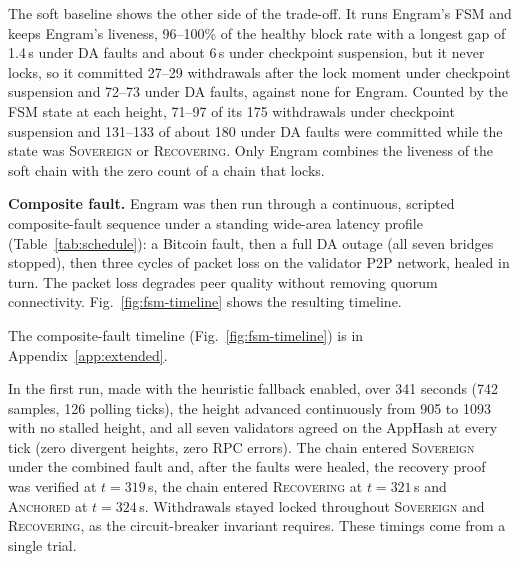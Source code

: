 The soft baseline shows the other side of the trade-off. It runs Engram's FSM
and keeps Engram's liveness, 96--100\% of the healthy block rate with a longest
gap of 1.4\,s under DA faults and about 6\,s under checkpoint suspension, but it never locks, so it committed 27--29 withdrawals after
the lock moment under checkpoint suspension and 72--73 under DA faults, against
none for Engram. Counted by the FSM state at each height, 71--97 of its 175
withdrawals under checkpoint suspension and 131--133 of about 180 under DA faults
were committed while the state was \textsc{Sovereign} or \textsc{Recovering}.
Only Engram combines the liveness of the soft chain with the zero count of a
chain that locks.

\textbf{Composite fault.} Engram was then run through a continuous, scripted
composite-fault sequence under a standing wide-area latency profile
(Table~\ref{tab:schedule}): a Bitcoin fault, then a full DA outage (all seven
bridges stopped), then three cycles of packet loss on the validator P2P
network, healed in turn. The
packet loss degrades peer quality without removing quorum connectivity.
Fig.~\ref{fig:fsm-timeline} shows the resulting timeline.

The composite-fault timeline (Fig.~\ref{fig:fsm-timeline}) is in Appendix~\ref{app:extended}.

In the first run, made with the heuristic fallback enabled, over 341 seconds (742 samples, 126 polling ticks), the height
advanced continuously from 905 to 1093 with no stalled height, and all seven
validators agreed on the AppHash at every tick (zero divergent heights, zero
RPC errors). The chain entered \textsc{Sovereign} under the combined fault
and, after the faults were healed, the recovery proof was verified at
$t{=}319$\,s, the chain entered \textsc{Recovering} at $t{=}321$\,s and
\textsc{Anchored} at $t{=}324$\,s. Withdrawals stayed locked throughout
\textsc{Sovereign} and \textsc{Recovering}, as the circuit-breaker invariant
requires. These timings come from a single trial.

